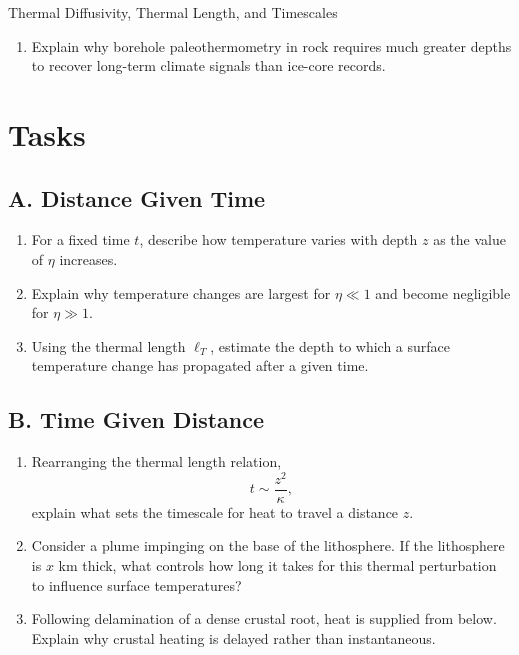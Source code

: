 \begin{activity}{Thermal Diffusivity, Thermal Length, and Timescales}
\begin{enumerate}
  \item Explain why borehole paleothermometry in rock requires much greater depths to recover long-term climate signals than ice-core records.
  \answerbox[3cm]
\end{enumerate}

\section*{Tasks}

\subsection*{A. Distance Given Time}
\begin{enumerate}
  \item For a fixed time $t$, describe how temperature varies with depth $z$ as
  the value of $\eta$ increases.
  \answerbox[2cm]

  \item Explain why temperature changes are largest for $\eta \ll 1$ and become
  negligible for $\eta \gg 1$.
  \answerbox[2cm]

  \item Using the thermal length $\ell_T$, estimate the depth to which a surface
  temperature change has propagated after a given time.
  \answerbox[2cm]
\end{enumerate}

\subsection*{B. Time Given Distance}
\begin{enumerate}
  \item Rearranging the thermal length relation,
  \[
  t \sim \frac{z^2}{\kappa},
  \]
  explain what sets the timescale for heat to travel a distance $z$.
  \answerbox[2cm]

  \item Consider a plume impinging on the base of the lithosphere.
  If the lithosphere is $x$ km thick, what controls how long it takes for this
  thermal perturbation to influence surface temperatures?
  \answerbox[2cm]

  \item Following delamination of a dense crustal root, heat is supplied from
  below. Explain why crustal heating is delayed rather than instantaneous.
  \answerbox[2cm]
\end{enumerate}


\end{activity}
